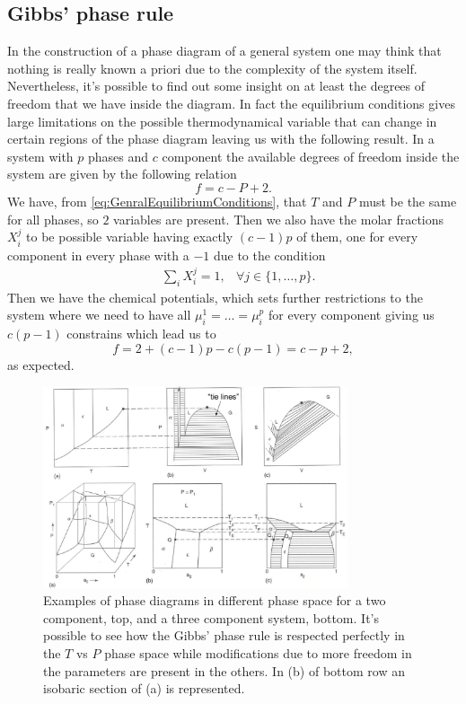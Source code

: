 \subsection{Gibbs' phase rule}

In the construction of a phase diagram of a general system one may think that nothing is really known a priori due to the complexity of the system itself. Nevertheless, it's possible to find out some insight on at least the degrees of freedom that we have inside the diagram. In fact the equilibrium conditions gives large limitations on the possible thermodynamical variable that can change in certain regions of the phase diagram leaving us with the following result.
{
    In a system with $p$ phases and $c$ component the available degrees of freedom inside the system are given by the following relation
    \begin{equation}
        \label{eq:GibbsPhaseRule}
        f = c - P + 2.
    \end{equation}
}
{
    We have, from \eqref{eq:GenralEquilibriumConditions}, that $T$ and $P$ must be the same for all phases, so $2$ variables are present. Then we also have the molar fractions $X_i^j$ to be possible variable having exactly $(c - 1)p$ of them, one for every component in every phase with a $-1$ due to the condition
    \begin{align}
        &\sum_i X^j_i = 1, &\forall j \in \{ 1, \dots, p \}.
    \end{align}
    Then we have the chemical potentials, which sets further restrictions to the system where we need to have all $\mu_i^1 = \dots = \mu_i^p$ for every component giving us $c(p-1)$ constrains which lead us to
    \begin{equation}
        f = 2 + (c-1)p - c(p-1) = c - p + 2,
    \end{equation}
    as expected.
}
\begin{figure}[t]
    \centering
    \includegraphics[width=0.8\textwidth]{Immagini/GeneralPhaseDiag.png}
    \caption
    {
        Examples of phase diagrams in different phase space for a two component, top, and a three component system, bottom. It's possible to see how the Gibbs' phase rule is respected perfectly in the $T$ vs $P$ phase space while modifications due to more freedom in the parameters are present in the others. In (b) of bottom row an isobaric section of (a) is represented.
    }
    \label{fig:GeneralPhaseDiag}
\end{figure}

